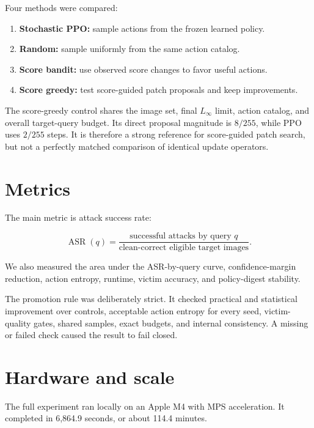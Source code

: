 \documentclass[11pt,a4paper]{report}
\begin{document}
Four methods were compared:

\begin{enumerate}
  \item \textbf{Stochastic PPO:} sample actions from the frozen learned policy.
  \item \textbf{Random:} sample uniformly from the same action catalog.
  \item \textbf{Score bandit:} use observed score changes to favor useful actions.
  \item \textbf{Score greedy:} test score-guided patch proposals and keep improvements.
\end{enumerate}

The score-greedy control shares the image set, final \(L_\infty\) limit, action catalog, and overall target-query budget. Its direct proposal magnitude is \(8/255\), while PPO uses \(2/255\) steps. It is therefore a strong reference for score-guided patch search, but not a perfectly matched comparison of identical update operators.

\section{Metrics}

The main metric is attack success rate:

\begin{equation}
\operatorname{ASR}(q)
=
\frac{
\text{successful attacks by query }q
}{
\text{clean-correct eligible target images}
}.
\end{equation}

We also measured the area under the ASR-by-query curve, confidence-margin reduction, action entropy, runtime, victim accuracy, and policy-digest stability.

The promotion rule was deliberately strict. It checked practical and statistical improvement over controls, acceptable action entropy for every seed, victim-quality gates, shared samples, exact budgets, and internal consistency. A missing or failed check caused the result to fail closed.

\section{Hardware and scale}

The full experiment ran locally on an Apple M4 with MPS acceleration. It completed in 6,864.9 seconds, or about 114.4 minutes.
\end{document}
